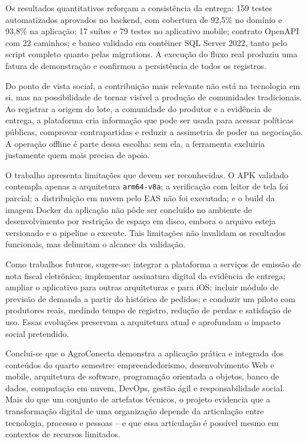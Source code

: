 Os resultados quantitativos reforçam a consistência da entrega: 159 testes
automatizados aprovados no backend, com cobertura de 92,5\% no domínio e 93,8\%
na aplicação; 17 suítes e 79 testes no aplicativo mobile; contrato OpenAPI com 22
caminhos; e banco validado em contêiner SQL Server 2022, tanto pelo script
completo quanto pelas migrations. A execução do fluxo real produziu uma fatura
de demonstração e confirmou a persistência de todos os registros.

Do ponto de vista social, a contribuição mais relevante não está na tecnologia em
si, mas na possibilidade de tornar visível a produção de comunidades
tradicionais. Ao registrar a origem do lote, a comunidade do produtor e a
evidência de entrega, a plataforma cria informação que pode ser usada para
acessar políticas públicas, comprovar contrapartidas e reduzir a assimetria de
poder na negociação. A operação offline é parte dessa escolha: sem ela, a
ferramenta excluiria justamente quem mais precisa de apoio.

O trabalho apresenta limitações que devem ser reconhecidas. O APK validado
contempla apenas a arquitetura \texttt{arm64-v8a}; a verificação com leitor de
tela foi parcial; a distribuição em nuvem pelo EAS não foi executada; e o build
da imagem Docker da aplicação não pôde ser concluído no ambiente de
desenvolvimento por restrição de espaço em disco, embora o arquivo esteja
versionado e o pipeline o execute. Tais limitações não invalidam os resultados
funcionais, mas delimitam o alcance da validação.

Como trabalhos futuros, sugere-se: integrar a plataforma a serviços de emissão
de nota fiscal eletrônica; implementar assinatura digital da evidência de
entrega; ampliar o aplicativo para outras arquiteturas e para iOS; incluir
módulo de previsão de demanda a partir do histórico de pedidos; e conduzir um
piloto com produtores reais, medindo tempo de registro, redução de perdas e
satisfação de uso. Essas evoluções preservam a arquitetura atual e aprofundam o
impacto social pretendido.

Conclui-se que o AgroConecta demonstra a aplicação prática e integrada dos
conteúdos do quarto semestre: empreendedorismo, desenvolvimento Web e mobile,
arquitetura de software, programação orientada a objetos, banco de dados,
computação em nuvem, DevOps, gestão ágil e responsabilidade social. Mais do que
um conjunto de artefatos técnicos, o projeto evidencia que a transformação
digital de uma organização depende da articulação entre tecnologia, processo e
pessoas -- e que essa articulação é possível mesmo em contextos de recursos
limitados.
